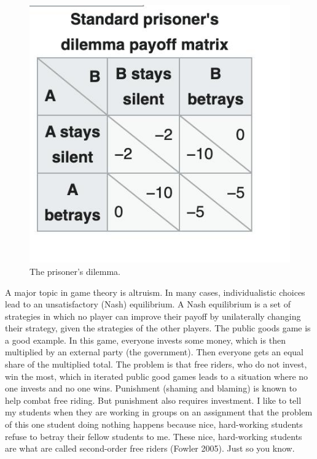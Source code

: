\documentclass[
  a4paper,
  DIV=11,
  numbers=noendperiod]{scrreprt}
\begin{document}
\begin{figure}

{\centering \includegraphics{media/ch5n/image9.jpg}

}

\caption{\label{fig-ch5n-img9-old-47}The prisoner's dilemma.}

\end{figure}

A major topic in game theory is altruism. In many cases, individualistic
choices lead to an unsatisfactory (Nash) equilibrium. A Nash equilibrium
is a set of strategies in which no player can improve their payoff by
unilaterally changing their strategy, given the strategies of the other
players. The public goods game is a good example. In this game, everyone
invests some money, which is then multiplied by an external party (the
government). Then everyone gets an equal share of the multiplied total.
The problem is that free riders, who do not invest, win the most, which
in iterated public good games leads to a situation where no one invests
and no one wins. Punishment (shaming and blaming) is known to help
combat free riding. But punishment also requires investment. I like to
tell my students when they are working in groups on an assignment that
the problem of this one student doing nothing happens because nice,
hard-working students refuse to betray their fellow students to me.
These nice, hard-working students are what are called second-order free
riders (Fowler 2005). Just so you know.
\end{document}
